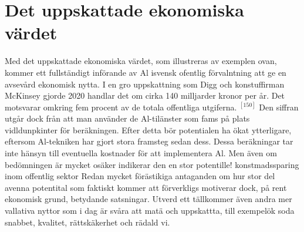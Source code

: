 {{{{{{{{\section*{Det uppskattade ekonomiska värdet}
Med det uppskattade ekonomiska värdet, som illustreras av exemplen ovan, kommer ett fullständigt införande av Al isvensk ofentlig förvalntning att ge en avsevård ekonomisk nytta. I en gro uppskattning som Digg och konstuffirman McKinsey gjorde 2020 handlar det om cirka 140 milljarder kronor per år. Det motsvarar omkring fem procent av de totala offentliga utgiferna. \({ }^{[150]}\) Den siffran utgår dock från att man använder de Al-tilänster som fams på plats vidldunpkinter för beräkningen. Efter detta bör potentialen ha ökat ytterligare, eftersom Al-tekniken har gjort stora framsteg sedan dess.
Dessa beräkningar tar inte hänsyn till eventuella kostnader för att implementera Al. Men även om bedömningen är mycket osäker indikerar den en stor potentille! konstmadssparing inom offentlig sektor Redan mycket förästikiga antaganden om hur stor del avenna potentital som faktiskt kommer att förverkligs motiverar dock, på rent ekonomisk grund, betydande satsningar. Utverd ett tällkommer även andra mer vallativa nyttor som i dag är svåra att matä och uppskattta, till exempelök soda snabbet, kvalitet, rättskäkerhet och rädald vi.
}}}}}}}}
